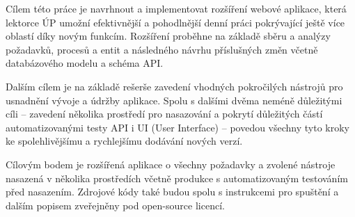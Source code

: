 Cílem této práce je navrhnout a implementovat rozšíření webové aplikace, která lektorce ÚP umožní efektivnější a pohodlnější denní práci pokrývající ještě více oblastí díky novým funkcím. Rozšíření proběhne na základě sběru a analýzy požadavků, procesů a entit a následného návrhu příslušných změn včetně databázového modelu a schéma API.

Dalším cílem je na základě rešerše zavedení vhodných pokročilých nástrojů pro usnadnění vývoje a údržby aplikace. Spolu s dalšími dvěma neméně důležitými cíli -- zavedení několika prostředí pro nasazování a pokrytí důležitých částí automatizovanými testy API i UI (User Interface) -- povedou všechny tyto kroky ke spolehlivějšímu a rychlejšímu dodávání nových verzí.

Cílovým bodem je rozšířená aplikace o všechny požadavky a zvolené nástroje nasazená v několika prostředích včetně produkce s automatizovaným testováním před nasazením. Zdrojové kódy také budou spolu s instrukcemi pro spuštění a dalším popisem zveřejněny pod open-source licencí.

